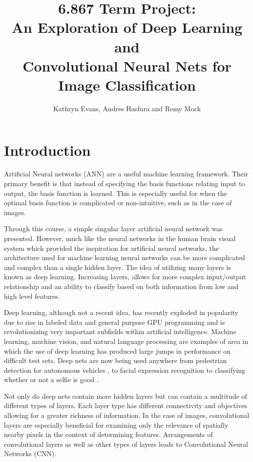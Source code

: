 \documentclass[12pt, twocolumn]{article}
\begin{document}
\title{ 6.867 Term Project: \\ An Exploration of Deep Learning and \\ Convolutional Neural Nets for Image Classification\\ }
 \author{Kathryn Evans, Andres Hasfura and Remy Mock}
\maketitle

\section{ Introduction} 
Artificial Neural networks (ANN) are a useful machine learning framework. Their primary benefit is that instead of specifying the basis functions relating input to output, the basis function is learned.  This is especially useful for when the optimal basis function is complicated or non-intuitive, such as in the case of images.


Through this course, a simple singular layer artificial neural network was presented. However, much like the neural networks in the human brain visual system which provided the inspiration for artificial neural networks, the architecture used for machine learning neural networks can be more complicated and complex than a single hidden layer. The idea of utilizing many layers is known as deep learning.  Increasing layers, allows for more complex input/output relationship and an ability to classify based on both information from low and high level features.

Deep learning, although not a recent idea, has recently exploded in popularity due to rise in labeled data and general purpose GPU programming and is revolutionizing very important subfields within artificial intelligence. Machine learning, machine vision, and natural language processing are examples of area in which the use of deep learning has produced large jumps in performance on difficult test sets. Deep nets are now being used anywhere from pedestrian detection for autonomous vehicles \cite{Szarvas2006}, to facial expression recognition \cite{Li2015} to classifying whether or not a selfie is good \cite{Karpathy}. 
	
Not only do deep nets contain more hidden layers but can contain a multitude of different types of layers. Each layer type has different connectivity and objectives allowing for a greater richness of information. In the case of images, convolutional layers are especially beneficial for examining only the relevance of spatially nearby pixels in the context of determining features. Arrangements of convolutional layers as well as other types of layers leads to Convolutional Neural Networks (CNN). 
\end{document}
